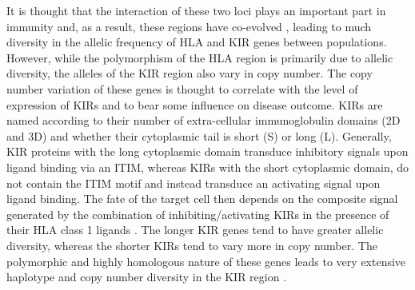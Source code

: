 It is thought that the interaction of these two loci plays an important part in immunity and, as a result, these regions have co-evolved \citep{Parham:2013eb},
leading to much diversity in the allelic frequency of HLA and KIR genes between populations.
However, while the polymorphism of the HLA region is primarily due to allelic diversity, 
the alleles of the \gls{KIR} region also vary in copy number.
The copy number variation of these genes is thought to correlate with the level of expression of \glspl{KIR} and to bear some influence on disease outcome.
\Glspl{KIR} are named according to their number of extra-cellular immunoglobulin domains (2D and 3D) and whether their cytoplasmic tail is short (S) or long (L).  
Generally, KIR proteins with the long cytoplasmic domain transduce inhibitory signals upon ligand binding via an \gls{ITIM},
whereas KIRs with the short cytoplasmic domain, do not contain the \gls{ITIM} motif and instead transduce an activating signal upon ligand binding.  
The fate of the target cell then depends on the composite signal generated by the combination of inhibiting/activating KIRs in the presence of their HLA class 1 ligands \citep{Bashirova:2006dj}.
The longer KIR genes tend to have greater allelic diversity, whereas the shorter KIRs tend to vary more in copy number.
The polymorphic and highly homologous nature of these genes leads to very extensive haplotype and copy number diversity in the KIR region \citep{Jiang:2012cf}.

